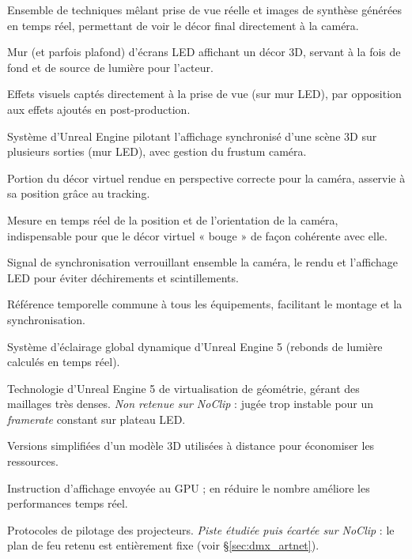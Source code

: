 \documentclass[11pt,a4paper]{report}
\begin{document}
\begin{description}[leftmargin=3.4cm,style=nextline,font=\bfseries\color{braccent}]
\item[Production virtuelle (VP)] Ensemble de techniques mêlant prise de vue réelle et images de synthèse générées en temps réel, permettant de voir le décor final directement à la caméra.
\item[Plateau LED / volume] Mur (et parfois plafond) d'écrans LED affichant un décor 3D, servant à la fois de fond et de source de lumière pour l'acteur.
\item[In-camera VFX] Effets visuels captés directement à la prise de vue (sur mur LED), par opposition aux effets ajoutés en post-production.
\item[nDisplay] Système d'Unreal Engine pilotant l'affichage synchronisé d'une scène 3D sur plusieurs sorties (mur LED), avec gestion du frustum caméra.
\item[Frustum] Portion du décor virtuel rendue en perspective correcte pour la caméra, asservie à sa position grâce au tracking.
\item[Tracking caméra] Mesure en temps réel de la position et de l'orientation de la caméra, indispensable pour que le décor virtuel « bouge » de façon cohérente avec elle.
\item[Genlock] Signal de synchronisation verrouillant ensemble la caméra, le rendu et l'affichage LED pour éviter déchirements et scintillements.
\item[Timecode] Référence temporelle commune à tous les équipements, facilitant le montage et la synchronisation.
\item[Lumen] Système d'éclairage global dynamique d'Unreal Engine 5 (rebonds de lumière calculés en temps réel).
\item[Nanite] Technologie d'Unreal Engine 5 de virtualisation de géométrie, gérant des maillages très denses. \emph{Non retenue sur \textit{NoClip}} : jugée trop instable pour un \emph{framerate} constant sur plateau LED.
\item[LOD (Level of Detail)] Versions simplifiées d'un modèle 3D utilisées à distance pour économiser les ressources.
\item[Draw call] Instruction d'affichage envoyée au GPU ; en réduire le nombre améliore les performances temps réel.
\item[DMX / Art-Net] Protocoles de pilotage des projecteurs. \emph{Piste étudiée puis écartée sur \textit{NoClip}} : le plan de feu retenu est entièrement fixe (voir §\ref{sec:dmx_artnet}).

\end{description}
\end{document}
